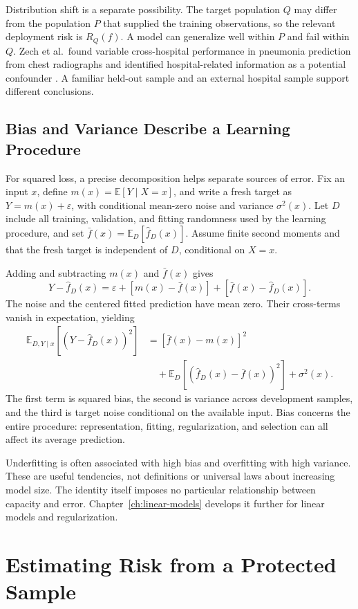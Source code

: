 Distribution shift is a separate possibility. The target population $Q$ may differ from the population $P$ that supplied the training observations, so the relevant deployment risk is $R_Q(f)$. A model can generalize well within $P$ and fail within $Q$. Zech et al.\ found variable cross-hospital performance in pneumonia prediction from chest radiographs and identified hospital-related information as a potential confounder \citep{zech2018}. A familiar held-out sample and an external hospital sample support different conclusions.

\subsection{Bias and Variance Describe a Learning Procedure}

For squared loss, a precise decomposition helps separate sources of error. Fix an input $x$, define $m(x)=\mathbb E[Y\mid X=x]$, and write a fresh target as $Y=m(x)+\varepsilon$, with conditional mean-zero noise and variance $\sigma^2(x)$. Let $D$ include all training, validation, and fitting randomness used by the learning procedure, and set $\bar f(x)=\mathbb E_D[\hat f_D(x)]$. Assume finite second moments and that the fresh target is independent of $D$, conditional on $X=x$.

Adding and subtracting $m(x)$ and $\bar f(x)$ gives
\[
Y-\hat f_D(x)
=\varepsilon+[m(x)-\bar f(x)]+[\bar f(x)-\hat f_D(x)].
\]
The noise and the centered fitted prediction have mean zero. Their cross-terms vanish in expectation, yielding
\begin{align*}
\mathbb E_{D,Y\mid x}[(Y-\hat f_D(x))^2]
&=[\bar f(x)-m(x)]^2\\
&\quad+\mathbb E_D[(\hat f_D(x)-\bar f(x))^2]+\sigma^2(x).
\end{align*}
The first term is squared bias, the second is variance across development samples, and the third is target noise conditional on the available input. Bias concerns the entire procedure: representation, fitting, regularization, and selection can all affect its average prediction.

Underfitting is often associated with high bias and overfitting with high variance. These are useful tendencies, not definitions or universal laws about increasing model size. The identity itself imposes no particular relationship between capacity and error. Chapter~\ref{ch:linear-models} develops it further for linear models and regularization.

\section{Estimating Risk from a Protected Sample}

